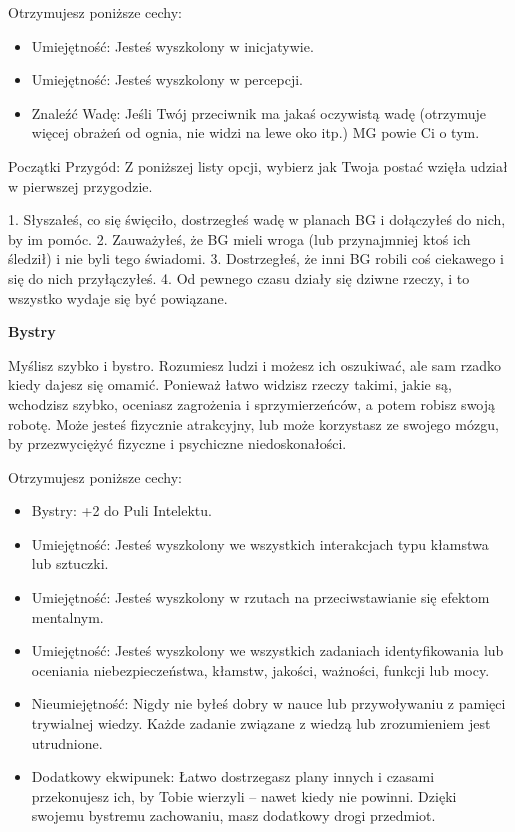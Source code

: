 Otrzymujesz poniższe cechy:
\begin{itemize}
\item Umiejętność: Jesteś wyszkolony w inicjatywie.
\item Umiejętność: Jesteś wyszkolony w percepcji.
\item Znaleźć Wadę: Jeśli Twój przeciwnik ma jakaś oczywistą wadę (otrzymuje więcej obrażeń od ognia, nie widzi na lewe oko itp.) MG powie Ci o tym.
\end{itemize}
    
Początki Przygód: Z poniższej listy opcji, wybierz jak Twoja postać wzięła udział w pierwszej przygodzie.

1. Słyszałeś, co się święciło, dostrzegłeś wadę w planach BG i dołączyłeś do nich, by im pomóc.
2. Zauważyłeś, że BG mieli wroga (lub przynajmniej ktoś ich śledził) i nie byli tego świadomi.
3. Dostrzegłeś, że inni BG robili coś ciekawego i się do nich przyłączyłeś.
4. Od pewnego czasu działy się dziwne rzeczy, i to wszystko wydaje się być powiązane.

\textbf{Bystry}

Myślisz szybko i bystro. Rozumiesz ludzi i możesz ich oszukiwać, ale sam rzadko kiedy dajesz się omamić. Ponieważ łatwo widzisz rzeczy takimi, jakie są, wchodzisz szybko, oceniasz zagrożenia i sprzymierzeńców, a potem robisz swoją robotę. Może jesteś fizycznie atrakcyjny, lub może korzystasz ze swojego mózgu, by przezwyciężyć fizyczne i psychiczne niedoskonałości. 

Otrzymujesz poniższe cechy:
\begin{itemize}
\item Bystry: +2 do Puli Intelektu.
\item Umiejętność: Jesteś wyszkolony we wszystkich interakcjach typu kłamstwa lub sztuczki.
\item Umiejętność: Jesteś wyszkolony w rzutach na przeciwstawianie się efektom mentalnym.
\item Umiejętność: Jesteś wyszkolony we wszystkich zadaniach identyfikowania lub oceniania niebezpieczeństwa, kłamstw, jakości, ważności, funkcji lub mocy.
\item Nieumiejętność: Nigdy nie byłeś dobry w nauce lub przywoływaniu z pamięci trywialnej wiedzy. Każde zadanie związane z wiedzą lub zrozumieniem jest utrudnione.
\item Dodatkowy ekwipunek: Łatwo dostrzegasz plany innych i czasami przekonujesz ich, by Tobie wierzyli – nawet kiedy nie powinni. Dzięki swojemu bystremu zachowaniu, masz dodatkowy drogi przedmiot.
\end{itemize}

